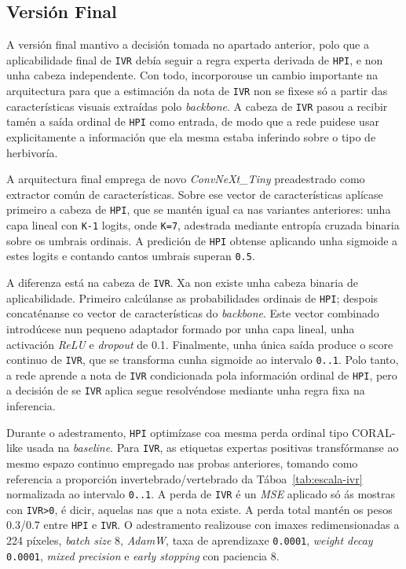 \subsection{Versión Final}
A versión final mantivo a decisión tomada no apartado anterior, polo que a aplicabilidade final de
\texttt{IVR} debía seguir a regra experta derivada de \texttt{HPI}, e non unha cabeza independente.
Con todo, incorporouse un cambio importante na arquitectura para que a estimación da nota de
\texttt{IVR} non se fixese só a partir das características visuais extraídas polo \textit{backbone}.
A cabeza de \texttt{IVR} pasou a recibir tamén a saída ordinal de \texttt{HPI} como entrada, de modo
que a rede puidese usar explicitamente a información que ela mesma estaba inferindo sobre o tipo de
herbivoría.

A arquitectura final emprega de novo \textit{ConvNeXt\_Tiny} preadestrado como extractor común de
características. Sobre ese vector de características aplícase primeiro a cabeza de \texttt{HPI}, que
se mantén igual ca nas variantes anteriores: unha capa lineal con \texttt{K-1} logits, onde
\texttt{K=7}, adestrada mediante entropía cruzada binaria sobre os umbrais ordinais. A predición de
\texttt{HPI} obtense aplicando unha sigmoide a estes logits e contando cantos umbrais superan
\texttt{0.5}.

A diferenza está na cabeza de \texttt{IVR}. Xa non existe unha cabeza binaria de aplicabilidade.
Primeiro calcúlanse as probabilidades ordinais de \texttt{HPI}; despois concaténanse co vector de
características do \textit{backbone}. Este vector combinado introdúcese nun pequeno adaptador
formado por unha capa lineal, unha activación \textit{ReLU} e \textit{dropout} de 0.1. Finalmente,
unha única saída produce o score continuo de \texttt{IVR}, que se transforma cunha sigmoide ao
intervalo \texttt{0..1}. Polo tanto, a rede aprende a nota de \texttt{IVR} condicionada pola
información ordinal de \texttt{HPI}, pero a decisión de se \texttt{IVR} aplica segue resolvéndose
mediante unha regra fixa na inferencia.

Durante o adestramento, \texttt{HPI} optimízase coa mesma perda ordinal tipo CORAL-like usada na
\textit{baseline}. Para \texttt{IVR}, as etiquetas expertas positivas transfórmanse ao mesmo espazo
continuo empregado nas probas anteriores, tomando como referencia a proporción invertebrado/vertebrado da
Táboa~\ref{tab:escala-ivr} normalizada ao intervalo \texttt{0..1}. A perda de \texttt{IVR} é un
\textit{MSE} aplicado só ás mostras con \texttt{IVR>0}, é dicir, aquelas nas que a nota existe. A
perda total mantén os pesos 0.3/0.7 entre \texttt{HPI} e \texttt{IVR}. O adestramento realizouse con
imaxes redimensionadas a 224 píxeles, \textit{batch size} 8, \textit{AdamW}, taxa de aprendizaxe
\texttt{0.0001}, \textit{weight decay} \texttt{0.0001}, \textit{mixed precision} e
\textit{early stopping} con paciencia 8.

